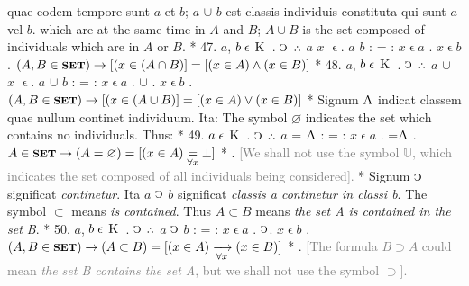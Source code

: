 \documentclass{book}
\newcommand{\C}{\mathop{\sbox0{$\displaystyle$$\reflectbox{C}$} %
\raisebox{-\height+\ht0-0.05cm}[\ht0][\dp0]{\scalebox{0.8}[0.8]{\copy0}}}\displaylimits} %
\newcommand{\pppNoSpace}{\leavevmode\lower0ex\hbox{.}\kern-0.1em\raise0.7ex\hbox{.}\kern-0.1em\lower0ex\hbox{.}} %
\newcommand{\abs}{\mathop{\rotatebox[origin=c]{180}{V}}}
\newcommand{\smallIn}{\ensuremath{\mathrel{\epsilon}}}
\newcommand{\K}{\mathop{\thinspace \text{K} \thinspace}}
\newcommand{\setOfSets}{\mathord{\text{{\footnotesize \textbf{SET}}}}}
\newcommand\irrelavent[1]{\textcolor{gray}{#1}}
\newenvironment{translateTwoCol}
               { %
                 \columnratio{0.5, 0.5}
                 \begin{paracol}{2}
                 \newcommand{\LAT}{\switchcolumn[0]*}
                 \newcommand{\ENG}{\switchcolumn[1]}
               }
               { %
                 \let\ENG\undefined
                 \let\LAT\undefined
                 \end{paracol}
               }
\begin{document}
\begin{translateTwoCol}
quae eodem tempore sunt $a$ et $b$; $a$ $\cup$ $b$ est classis individuis constituta qui sunt $a$ vel $b$.
\ENG
which are at the same time in $A$ and $B$; $A \cup B$ is the set composed of individuals which are in $A$ or $B$.
\LAT
47. \hspace{0.67cm} $a$, $b \smallIn \K$ . $\C$ $\pppNoSpace$ $a$ $x$ \smallIn . $a$ $b$ : = : $x \smallIn a$ . $x \smallIn b$
\ENG
47. \hspace{0.67cm} $(A, B \in \setOfSets) \rightarrow [(x \in (A \cap B)] = [(x \in A) \wedge (x \in B)]$
\LAT
48. \hspace{0.67cm} $a$, $b \smallIn \K$ . $\C$ $\pppNoSpace$ $a$ $\cup$ $x$ \smallIn . $a$ $\cup$ $b$ : = : $x \smallIn a$ . $\cup$ . $x \smallIn b$
\ENG
48. \hspace{0.67cm} $(A, B \in \setOfSets) \rightarrow  [(x \in (A \cup B)] = [(x \in A) \vee (x \in B)]$
\LAT
\quad Signum $\abs$ indicat classem quae nullum continet individuum. Ita:
\ENG
\quad The symbol $\varnothing$ indicates the set which contains no individuals. Thus:
\LAT
49. \hspace{0.67cm} $a \smallIn \K$ . $\C$ $\pppNoSpace$ $a$ = $\abs$ : = : $x \smallIn a$ . =\scalebox{0.7}{$x$}\thinspace  $\abs$
\ENG
49. \hspace{0.67cm} $A \in \setOfSets \rightarrow (A= \varnothing) = [(x \in A) \underset{\forall x}= \bot]$ 
\LAT
{}.
\ENG
\quad \irrelavent{[We shall not use the symbol $\mathbb{U}$, which indicates the set composed of all individuals being considered].}
\LAT
\quad Signum $\C$ significat \emph{continetur}. Ita $a$ $\C$ $b$ significat \emph{classis a continetur in classi b}.
\ENG
\quad The symbol $\subset$ means \emph{is contained}. Thus $A \subset B$ means \emph{the set A is contained in the set B}.
\LAT
50. \hspace{0.67cm} $a$, $b \smallIn \K$ . $\C$ $\pppNoSpace$ $a$ $\C$ $b$ : = : $x \smallIn a$ . $\C$\scalebox{0.7}{$x$}\thinspace . $x \smallIn b$
\ENG
50. \hspace{0.67cm} $(A, B \in \setOfSets) \rightarrow (A \subset B)=[(x\in A) \xrightarrow[\forall x]{} (x \in B)]$
\LAT
{}.
\ENG
\quad \irrelavent{[The formula $B \supset A$ could mean \emph{the set B contains the set A}, but we shall not use the symbol $\supset$].}

\end{translateTwoCol}
\end{document}
